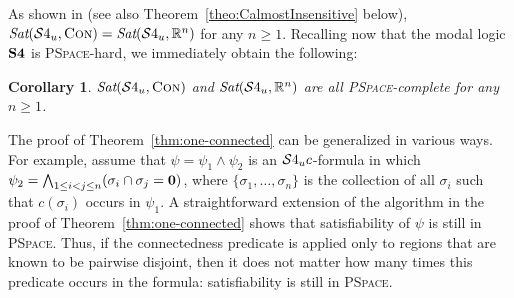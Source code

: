 \documentclass{LMCS}
\theoremstyle{plain}
\newtheorem{corollary}[thm]{Corollary}
\newcommand{\Sat}{\textit{Sat}}
\newcommand{\PSpace}{\textsc{PSpace}}
\begin{document}
As shown in \cite{Shehtman99} (see also Theorem~\ref{theo:CalmostInsensitive} below), $\Sat(\SFU,\Con) = \Sat(\SFU,\R^n)$ for
any $n\geq 1$. Recalling now that the modal logic
${\bf S4}$ is \PSpace-hard, we immediately obtain the following:
\begin{corollary}\label{SFUoverR}
$\Sat(\SFU,\Con)$ and $\Sat(\SFU,\R^n)$ are all \PSpace-complete for any $n\geq 1$.
\end{corollary}

The proof of Theorem~\ref{thm:one-connected} can be generalized in various ways. For example, assume that
$\psi= \psi_{1} \wedge \psi_{2}$ is an $\mathcal{S}4_u{}c$-formula in which
$\psi_{2}= \bigwedge_{1\leq i < j\leq n}(\sigma_{i}\cap \sigma_{j}=\mathbf{0})$, where $\{\sigma_{1},\ldots,\sigma_{n}\}$
is the collection of all $\sigma_{i}$ such that $c(\sigma_{i})$ occurs in $\psi_1$. A straightforward extension
of the algorithm in the proof of Theorem~\ref{thm:one-connected} shows that satisfiability of $\psi$
is still in \PSpace. Thus, if the
connectedness predicate is applied only to regions
that are known to be pairwise disjoint, then it does not matter how
many times this predicate occurs in the formula: satisfiability is
still in \PSpace.
\end{document}
